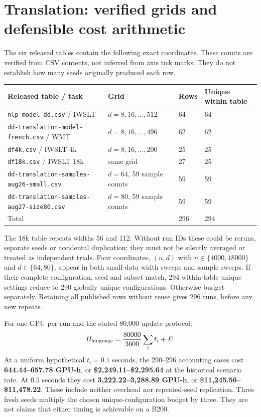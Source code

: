 \documentclass{article}
\begin{document}
\section{Translation: verified grids and defensible cost arithmetic}
The six released tables contain the following exact coordinates. These
counts are verified from CSV contents, not inferred from axis tick marks.
They do not establish how many seeds originally produced each row.
\begin{center}\small
\begin{tabular}{@{}llll@{}}
\toprule
Released table / task & Grid & Rows & Unique within table\\\midrule
\texttt{nlp-model-dd.csv} / IWSLT & $d=8,16,\ldots,512$ & 64 & 64\\
\texttt{dd-translation-model-french.csv} / WMT & $d=8,16,\ldots,496$ & 62 & 62\\
\texttt{df4k.csv} / IWSLT 4k & $d=8,16,\ldots,200$ & 25 & 25\\
\texttt{df18k.csv} / IWSLT 18k & same grid & 27 & 25\\
\texttt{dd-translation-samples-aug26-small.csv} & $d=64$, 59 sample counts & 59 & 59\\
\texttt{dd-translation-samples-aug27-size80.csv} & $d=80$, 59 sample counts & 59 & 59\\\midrule
Total & & 296 & 294\\\bottomrule
\end{tabular}
\end{center}
The 18k table repeats widths 56 and 112. Without run IDs these could be
reruns, separate seeds or accidental duplication; they must not be silently
averaged or treated as independent trials. Four coordinates, $(n,d)$ with
$n\in\{4000,18000\}$ and $d\in\{64,80\}$, appear in both small-data width
sweeps and sample sweeps. If their complete configuration, seed and subset
match, 294 within-table unique settings reduce to 290 globally unique
configurations. Otherwise budget separately. Retaining all published rows
without reuse gives 296 runs, before any new repeats.

For one GPU per run and the stated 80,000-update protocol:
\[
 H_{\rm language}=\frac{80000}{3600}\sum_i t_i+E.
\]
At a uniform hypothetical $t_i=0.1$ seconds, the 290--296 accounting cases
cost \textbf{644.44--657.78 GPU-h}, or \textbf{\$2,249.11--\$2,295.64} at the
historical scenario rate. At $0.5$ seconds they cost
\textbf{3,222.22--3,288.89 GPU-h}, or \textbf{\$11,245.56--\$11,478.22}.
These include neither overhead nor repeated-seed replication. Three fresh
seeds multiply the chosen unique-configuration budget by three. They are
not claims that either timing is achievable on a B200.
\end{document}
